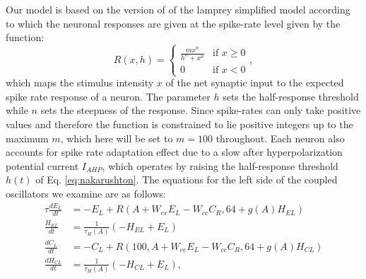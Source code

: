\documentclass[10pt,a4paper]{article}
\begin{document}
%
Our model is based on the version of \cite{wilson1999spikes} of the lamprey simplified model \citep{lansner1997realistic}  according to which the neuronal responses are given at the spike-rate level given by the \cite{naka1966s} function:
\begin{equation}
\label{eq:nakarushton}
R(x,h) = \begin{cases} 
\frac{m x^n}{h^n + x^n} &\mbox{if } x \geq 0 \\
0 						&\mbox{if } x < 0
\end{cases},
\end{equation}
which maps the stimulus intensity $x$ of the net synaptic input to the expected spike rate response of a neuron. The parameter $h$ sets the half-response threshold while $n$ sets the steepness of the response. Since spike-rates can only take positive values and therefore the function is constrained to lie positive integers up to the maximum $m$, which here will be set to $m=100$ throughout.%
Each neuron also accounts for spike rate adaptation effect due to a slow after hyperpolarization potential current $I_{AHP}$, which operates by raising the half-response threshold $h(t)$ of Eq. \eqref{eq:nakarushton}. The equations for the left side of the coupled oscillators we examine are as follows:
\begin{align}
\tau \frac{dE_L}{dt} & = - E_L +  R( A + W_{ee} E_L - W_{cc}C_R, 64 + g(A)H_{EL})\\
\frac{H_{EL}}{dt} &= \frac{1}{\tau_H(A)}(-H_{EL}+E_L)\\
\frac{dC_L}{dt} &= -C_L + R(100, A + W_{ce}E_L - W_{cc}C_R, 64+g(A)H_{CL})\\
\frac{dH_{CL}}{dt} &= \frac{1}{\tau_H(A)}(-H_{CL}+E_L),
\end{align}
\end{document}
